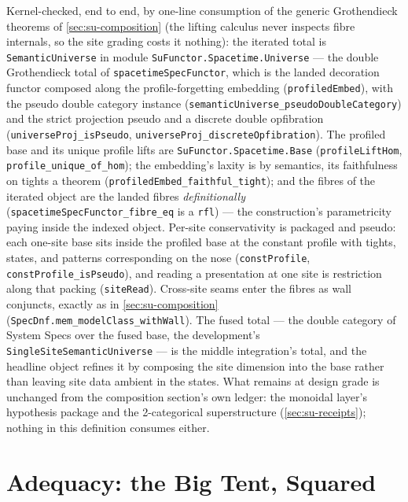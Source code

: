 \begin{remark}
\label{rem:su-total-mechanized}
\sloppy
Kernel-checked, end to end, by one-line consumption of the generic
Grothendieck theorems of \autoref{sec:su-composition} (the lifting
calculus never inspects fibre internals, so the site grading costs
it nothing): the iterated total is
\texttt{SemanticUniverse} in module
\texttt{SuFunctor.Spacetime.Universe} --- the double Grothendieck
total of \texttt{spacetimeSpecFunctor}, which is the landed
decoration functor composed along the profile-forgetting embedding
(\texttt{profiledEmbed}), with the pseudo double category instance
(\texttt{semanticUniverse\_pseudoDoubleCategory}) and the
strict projection pseudo and a discrete double opfibration
(\texttt{universeProj\_isPseudo},
\texttt{universeProj\_discreteOpfibration}). The profiled
base and its unique profile lifts are
\texttt{SuFunctor.Spacetime.Base} (\texttt{profileLiftHom},
\texttt{profile\_unique\_of\_hom}); the embedding's laxity is by
semantics, its faithfulness on tights a theorem
(\texttt{profiledEmbed\_faithful\_tight}); and the fibres of the
iterated object are the landed fibres \emph{definitionally}
(\texttt{spacetimeSpecFunctor\_fibre\_eq} is a \texttt{rfl}) ---
the construction's parametricity paying inside the indexed object.
Per-site conservativity is packaged and pseudo: each one-site base
sits inside the profiled base at the constant profile with tights,
states, and patterns corresponding on the nose
(\texttt{constProfile}, \texttt{constProfile\_isPseudo}), and
reading a presentation at one site is restriction along that
packing (\texttt{siteRead}). Cross-site seams enter the fibres as
wall conjuncts, exactly as in \autoref{sec:su-composition}
(\texttt{SpecDnf.mem\_modelClass\_withWall}). The fused total ---
the double category of System Specs over the fused base, the
development's \texttt{SingleSiteSemanticUniverse} --- is the middle
integration's total, and the headline object refines it by
composing the site dimension into the base rather than leaving
site data ambient in the states. What remains at design grade is
unchanged from the composition section's own ledger: the monoidal
layer's hypothesis package and the 2-categorical superstructure
(\autoref{sec:su-receipts}); nothing in this definition
consumes either.
\end{remark}

\section{Adequacy: the Big Tent, Squared}
\label{sec:su-adequacy}

